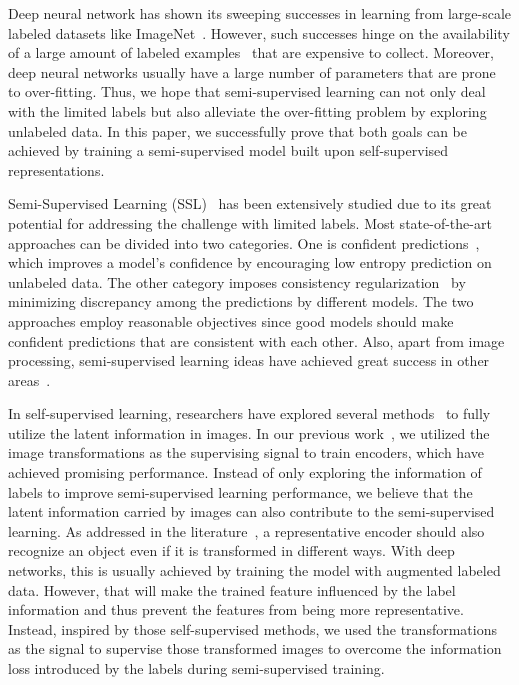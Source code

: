\documentclass[journal]{IEEEtran}
\begin{document}
Deep neural network has shown its sweeping successes in learning from large-scale labeled datasets like ImageNet~\cite{deng2009imagenet}. However, such successes hinge on the availability of a large amount of labeled examples~\cite{qi2016hierarchically,hua2008online,qi2008correlative} that are expensive to collect. Moreover, deep neural networks usually have a large number of parameters that are prone to over-fitting. Thus, we hope that semi-supervised learning can not only deal with the limited labels but also alleviate the over-fitting problem by exploring unlabeled data. In this paper, we successfully prove that both goals can be achieved by training a semi-supervised model built upon self-supervised representations.
\par Semi-Supervised Learning (SSL)~\cite{chapelle2009semi,grandvalet2005semi,gong2016multi,wu2017semi,nie2017auto,qi2018global,wang2012recommending,zhao2018adversarial} has  been extensively studied due to its great potential for addressing the challenge with limited labels. Most  state-of-the-art approaches can be divided into two categories. One is confident predictions~\cite{grandvalet2005semi,miyato2018virtual,lee2013pseudo}, which improves a model's confidence by encouraging low entropy prediction on unlabeled data. The other category imposes consistency regularization~\cite{cirecsan2010deep,laine2016temporal,sajjadi2016regularization,tarvainen2017mean} by minimizing discrepancy among the predictions by different models. The two approaches employ reasonable objectives since good models should make confident predictions that are consistent with each other. Also, apart from image processing, semi-supervised learning ideas have achieved great success in other areas~\cite{zhuang2017label,dupre2019improving,tao2017scalable,turian2010word,papandreou2015weakly,cheplygina2019not}.
\par 

In self-supervised learning, researchers have explored several methods~\cite{zhang2019aet,he2020momentum} to fully utilize the latent information in images. In our previous work~\cite{zhang2019aet,Qi_2019_ICCV}, we utilized the image transformations as the supervising signal to train encoders, which have achieved promising performance. Instead of only exploring the information of labels to improve semi-supervised learning performance, we believe that the latent information carried by images can also contribute to the semi-supervised learning. As addressed in the  literature~\cite{hinton2011transforming,gidaris2018unsupervised,zhang2019aet}, a representative encoder should also recognize an object even if it is transformed in different ways. With deep networks, this is usually achieved by training the model with augmented labeled data. However, that will make the trained feature influenced by the label information and thus prevent the features from being more representative. Instead, inspired by those self-supervised methods, we used the transformations as the signal to supervise those transformed images to overcome the information loss introduced by the labels during semi-supervised training.
\end{document}
